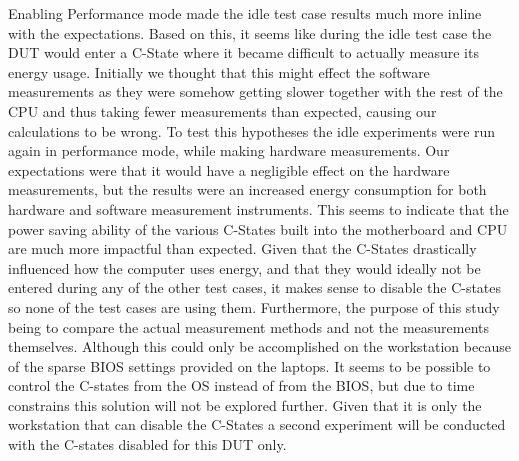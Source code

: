 

Enabling Performance mode made the idle test case results much more inline with the expectations. Based on this, it seems like during the idle test case the DUT would enter a C-State where it became difficult to actually measure its energy usage. Initially we thought that this might effect the software measurements as they were somehow getting slower together with the rest of the CPU and thus taking fewer measurements than expected, causing our calculations to be wrong. To test this hypotheses the idle experiments were run again in performance mode, while making hardware measurements. Our expectations were that it would have a negligible effect on the hardware measurements, but the results were an increased energy consumption for both hardware and software measurement instruments. This seems to indicate that the power saving ability of the various C-States built into the motherboard and CPU are much more impactful than expected. Given that the C-States drastically influenced how the computer uses energy, and that they would ideally not be entered during any of the other test cases, it makes sense to disable the C-states so none of the test cases are using them. Furthermore, the purpose of this study being to compare the actual measurement methods and not the measurements themselves. Although this could only be accomplished on the workstation because of the sparse BIOS settings provided on the laptops.
It seems to be possible to control the C-states from the OS instead of from the BIOS, but due to time constrains this solution will not be explored further\cite{CMete,CLinux}. Given that it is only the workstation that can disable the C-States a second experiment will be conducted with the C-states disabled for this DUT only.

